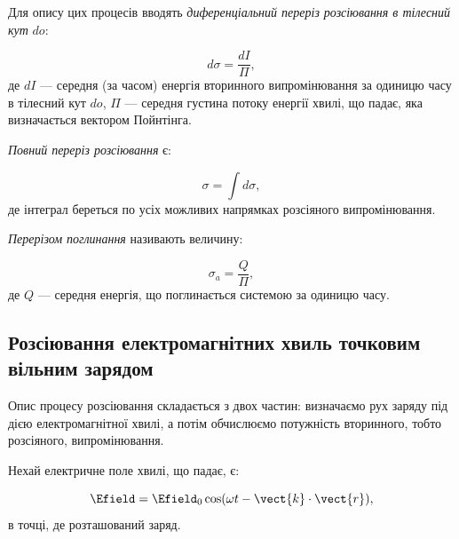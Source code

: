 Для опису цих процесів вводять \emph{диференціальний переріз розсіювання в тілесний
кут} \( do \):

\begin{equation}
d\sigma = \frac{dI}{\Pi},
\label{eq:differential_cross_section}
\end{equation}
де \( dI \) --- середня (за часом) енергія вторинного випромінювання за одиницю часу в тілесний кут \( do \), \( \Pi \)
— середня густина потоку енергії хвилі, що падає, яка визначається вектором Пойнтінга.

\textit{Повний переріз розсіювання} є:

\begin{equation}
\sigma = \int d\sigma,
\label{eq:total_cross_section}
\end{equation}
де інтеграл береться по усіх можливих напрямках розсіяного випромінювання.

\textit{Перерізом поглинання} називають величину:

\begin{equation}
\sigma_a = \frac{Q}{\Pi},
\label{eq:absorption_cross_section}
\end{equation}
де \( Q \) --- середня енергія, що поглинається системою за одиницю часу.

\subsection*{Розсіювання електромагнітних хвиль точковим вільним зарядом}

Опис процесу розсіювання складається з двох частин: визначаємо рух заряду під дією електромагнітної хвилі, а потім
обчислюємо потужність вторинного, тобто розсіяного, випромінювання.

Нехай електричне поле хвилі, що падає, є:

\begin{equation}
\Efield = \Efield_0 \cos(\omega t - \vect{k} \cdot \vect{r}),
\label{eq:incident_wave}
\end{equation}
%
в точці, де розташований заряд.

